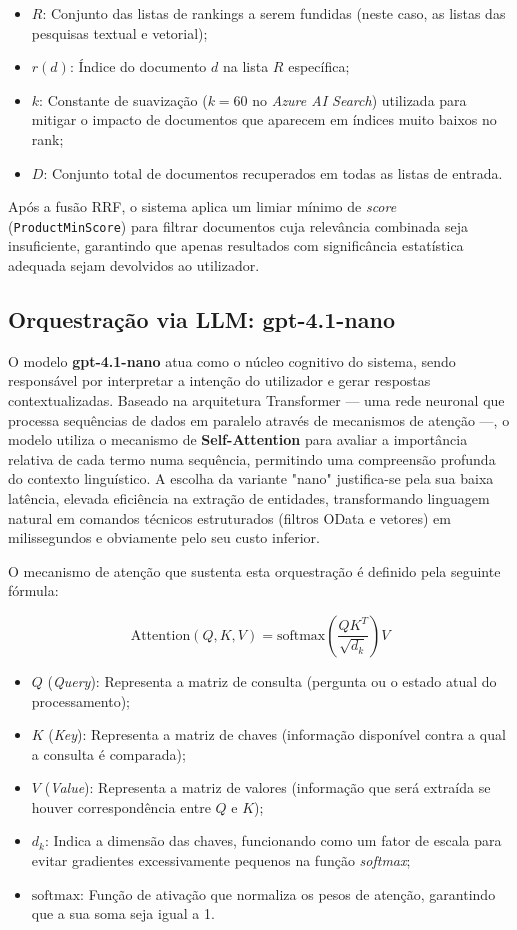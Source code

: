 \documentclass[runningheads]{llncs}
\begin{document}
\begin{itemize}
\item $R$: Conjunto das listas de rankings a serem fundidas (neste caso, as listas das pesquisas textual e vetorial);
\item $r(d)$: Índice do documento $d$ na lista $R$ específica;
\item $k$: Constante de suavização ($k = 60$ no \textit{Azure AI Search}) utilizada para mitigar o impacto de documentos que aparecem em índices muito baixos no rank;
\item $D$: Conjunto total de documentos recuperados em todas as listas de entrada.
\end{itemize}

Após a fusão RRF, o sistema aplica um limiar mínimo de \textit{score} (\texttt{ProductMinScore}) para filtrar documentos cuja relevância combinada seja insuficiente, garantindo que apenas resultados com significância estatística adequada sejam devolvidos ao utilizador.

\subsection*{Orquestração via LLM: gpt-4.1-nano}
O modelo \textbf{gpt-4.1-nano} atua como o núcleo cognitivo do sistema, sendo responsável por interpretar a intenção do utilizador e gerar respostas contextualizadas. Baseado na arquitetura Transformer --- uma rede neuronal que processa sequências de dados em paralelo através de mecanismos de atenção ---, o modelo utiliza o mecanismo de \textbf{Self-Attention} para avaliar a importância relativa de cada termo numa sequência, permitindo uma compreensão profunda do contexto linguístico. A escolha da variante "nano" justifica-se pela sua baixa latência, elevada eficiência na extração de entidades, transformando linguagem natural em comandos técnicos estruturados (filtros OData e vetores) em milissegundos e obviamente pelo seu custo inferior.

O mecanismo de atenção que sustenta esta orquestração é definido pela seguinte fórmula:

$$\text{Attention}(Q, K, V) = \text{softmax}\left(\frac{QK^T}{\sqrt{d_k}}\right)V$$

\begin{itemize}
\item $Q$ (\textit{Query}): Representa a matriz de consulta (pergunta ou o estado atual do processamento);
\item $K$ (\textit{Key}): Representa a matriz de chaves (informação disponível contra a qual a consulta é comparada);
\item $V$ (\textit{Value}): Representa a matriz de valores (informação que será extraída se houver correspondência entre $Q$ e $K$);
\item $d_k$: Indica a dimensão das chaves, funcionando como um fator de escala para evitar gradientes excessivamente pequenos na função \textit{softmax};
\item $\text{softmax}$: Função de ativação que normaliza os pesos de atenção, garantindo que a sua soma seja igual a 1.
\end{itemize}
\end{document}
